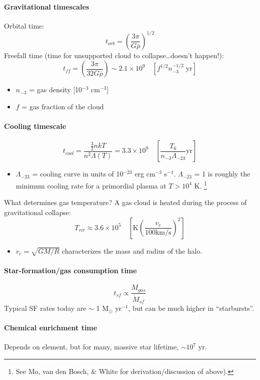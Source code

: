 \documentclass{article}
\begin{document}
\paragraph{Gravitational timescales}
Orbital time:
\[
    t_{orb} = \left( \frac{3\pi}{G\overline{\rho}} \right)^{1/2}
    \]
Freefall time (time for unsupported cloud to collapse\ldots doesn't happen!):
\[
    t_{ff} = \left( \frac{3\pi}{32G\overline{\rho}} \right)
    \sim 2.1\times10^{9}\quad [f^{1/2}n_{-3}^{-1/2}\; \mathrm{yr}]
    \]
\begin{itemize}
    \item $n_{-3}$ = gas density [10$^{-3}$ cm$^{-3}$]
    \item $f$ = gas fraction of the cloud
\end{itemize}

\paragraph{Cooling timescale}
\[
    t_{cool} = \frac{\frac{3}{2} nkT}{n^{2}\Lambda(T)}
    = 3.3\times10^{9}\quad \left[
        \frac{T_{6}}{n_{-3}\Lambda_{-23}} \mathrm{yr}
        \right]
    \]
\begin{itemize}
    \item $\Lambda_{-23}$ =
        cooling curve in units of 10$^{-23}$ erg cm$^{-3}$ s$^{-1}$.
        $\Lambda_{-23}$ = 1 is roughly the minimum cooling rate for a
        primordial plasma at $T > 10^{4}$ K.
        \footnote{See Mo, van den Bosch, \& White for derivation/discussion of above).}
\end{itemize}
What determines gas temperature?
A gas cloud is heated during the process of gravitational collapse:
\[
    T_{vir} \approx 3.6\times10^{5}\quad \left[
        \mathrm{K} \left( \frac{v_{c}}{100\mathrm{km/s}} \right)^{2}
        \right]
    \]
\begin{itemize}
    \item $v_{c} = \sqrt{GM/R}$ characterizes the mass and radius of the halo.
\end{itemize}

\paragraph{Star-formation/gas consumption time}
\[
    t_{sf} \propto \frac{M_{gas}}{\dot{M}_{sf}}
    \]
Typical SF rates today are $\sim$ 1 M$_{\odot}$ yr$^{-1}$, but can be
much higher in ``starbursts''.

\paragraph{Chemical enrichment time}
Depends on element, but for many, massive star lifetime, $\sim 10^{7}$ yr.
\end{document}

